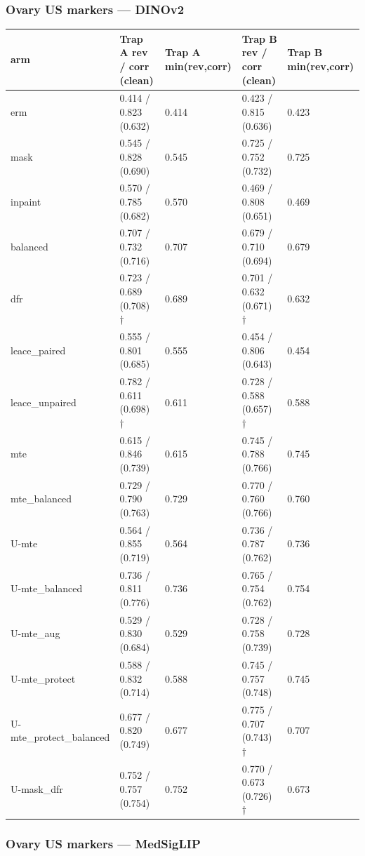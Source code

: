 {\subsubsection{Ovary US markers --- DINOv2}\label{ovary-us-markers--dinov2}

{ %
\begin{longtable}[]{@{}lllll@{}}
\toprule\noalign{}
arm & Trap A rev / corr (clean) & Trap A min(rev,corr) & Trap B rev / corr (clean) & Trap B min(rev,corr) \\
\midrule\noalign{}
\endhead
\bottomrule\noalign{}
\endlastfoot
erm & 0.414 / 0.823 (0.632) & 0.414 & 0.423 / 0.815 (0.636) & 0.423 \\
mask & 0.545 / 0.828 (0.690) & 0.545 & 0.725 / 0.752 (0.732) & 0.725 \\
inpaint & 0.570 / 0.785 (0.682) & 0.570 & 0.469 / 0.808 (0.651) & 0.469 \\
balanced & 0.707 / 0.732 (0.716) & 0.707 & 0.679 / 0.710 (0.694) & 0.679 \\
dfr & 0.723 / 0.689 (0.708) † & 0.689 & 0.701 / 0.632 (0.671) † & 0.632 \\
leace\_paired & 0.555 / 0.801 (0.685) & 0.555 & 0.454 / 0.806 (0.643) & 0.454 \\
leace\_unpaired & 0.782 / 0.611 (0.698) † & 0.611 & 0.728 / 0.588 (0.657) † & 0.588 \\
mte & 0.615 / 0.846 (0.739) & 0.615 & 0.745 / 0.788 (0.766) & 0.745 \\
mte\_balanced & 0.729 / 0.790 (0.763) & 0.729 & 0.770 / 0.760 (0.766) & 0.760 \\
U-mte & 0.564 / 0.855 (0.719) & 0.564 & 0.736 / 0.787 (0.762) & 0.736 \\
U-mte\_balanced & 0.736 / 0.811 (0.776) & 0.736 & 0.765 / 0.754 (0.762) & 0.754 \\
U-mte\_aug & 0.529 / 0.830 (0.684) & 0.529 & 0.728 / 0.758 (0.739) & 0.728 \\
U-mte\_protect & 0.588 / 0.832 (0.714) & 0.588 & 0.745 / 0.757 (0.748) & 0.745 \\
U-mte\_protect\_balanced & 0.677 / 0.820 (0.749) & 0.677 & 0.775 / 0.707 (0.743) † & 0.707 \\
U-mask\_dfr & 0.752 / 0.757 (0.754) & 0.752 & 0.770 / 0.673 (0.726) † & 0.673 \\
\end{longtable}
}

\subsubsection{Ovary US markers --- MedSigLIP}\label{ovary-us-markers--medsiglip}

}
